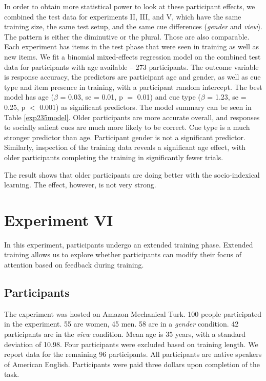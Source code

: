 \documentclass{frontiersSCNS} %
\begin{document}
In order to obtain more statistical power to look at these participant effects, we combined the test data for experiments II, III, and V, which have the same training size, the same test setup, and the same cue differences (\emph{gender} and \emph{view}). The pattern is either the diminutive or the plural. Those are also comparable. Each experiment has items in the test phase that were seen in training as well as new items.  We fit a binomial mixed-effects regression model on the combined test data for participants with age available -- 273 participants. The outcome variable is response accuracy, the predictors are participant age and gender, as well as cue type and item presence in training, with a participant random intercept. The best model has age ($\beta{}$ = 0.03, se = 0.01,  p $=$ 0.01) and cue type ($\beta{}$ = 1.23, se = 0.25, p $<$ 0.001) as significant predictors. The model summary can be seen in Table \ref{exp235model}. Older participants are more accurate overall, and responses to socially salient cues are much more likely to be correct. Cue type is a much stronger predictor than age. Participant gender is not a significant predictor.  Similarly, inspection of the training data reveals a significant age effect, with older participants completing the training in significantly fewer trials.

The result shows that older participants are doing better with the socio-indexical learning. The effect, however, is not very strong. 


\section{Experiment VI}


In this experiment, participants undergo an extended training phase. Extended training allows us to explore whether participants can modify their focus of attention based on feedback during training.



\subsection{Participants}

The experiment was hosted on Amazon Mechanical Turk. 100 people participated in the experiment. 55 are women, 45 men. 58 are in a \emph{gender} condition. 42 participants are in the \emph{view} condition. Mean age is 35 years, with a standard deviation of 10.98. Four participants were excluded based on training length. We report data for the remaining 96 participants. All participants are native speakers of American English. Participants were paid three dollars upon completion of the task.
\end{document}
